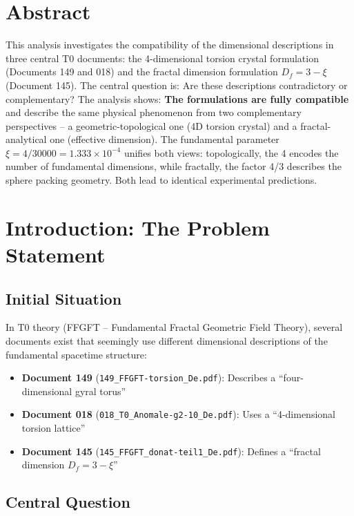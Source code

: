 \section*{Abstract}
		This analysis investigates the compatibility of the dimensional descriptions in three central T0 documents: the 4-dimensional torsion crystal formulation (Documents 149 and 018) and the fractal dimension formulation $D_f = 3 - \xi$ (Document 145). The central question is: Are these descriptions contradictory or complementary? The analysis shows: \textbf{The formulations are fully compatible} and describe the same physical phenomenon from two complementary perspectives -- a geometric-topological one (4D torsion crystal) and a fractal-analytical one (effective dimension). The fundamental parameter $\xi = 4/30000 = 1.333 \times 10^{-4}$ unifies both views: topologically, the 4 encodes the number of fundamental dimensions, while fractally, the factor 4/3 describes the sphere packing geometry. Both lead to identical experimental predictions.

	
	
	\section{Introduction: The Problem Statement}
	
	\subsection{Initial Situation}
	
	In T0 theory (FFGFT -- Fundamental Fractal Geometric Field Theory), several documents exist that seemingly use different dimensional descriptions of the fundamental spacetime structure:
	
	\begin{itemize}
		\item \textbf{Document 149} (\texttt{149\_FFGFT-torsion\_De.pdf}): Describes a \enquote{four-dimensional gyral torus}
		\item \textbf{Document 018} (\texttt{018\_T0\_Anomale-g2-10\_De.pdf}): Uses a \enquote{4-dimensional torsion lattice}
		\item \textbf{Document 145} (\texttt{145\_FFGFT\_donat-teil1\_De.pdf}): Defines a \enquote{fractal dimension $D_f = 3 - \xi$}
	\end{itemize}
	
	\subsection{Central Question}
	
